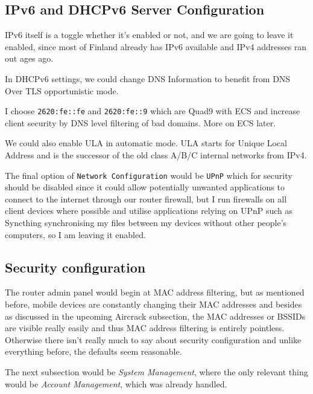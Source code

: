 \documentclass[../wifi-security.tex]{subfiles}
\begin{document}
\subsection{IPv6 and DHCPv6 Server Configuration}

IPv6 itself is a toggle whether it's enabled or not, and we are going to leave it enabled, since most of Finland already has IPv6 available and IPv4 addresses ran out ages ago.

In DHCPv6 settings, we could change DNS Information to benefit from DNS Over TLS opportunistic mode. %


I choose \texttt{2620:fe::fe} and \texttt{2620:fe::9} which are Quad9 with ECS and increase client security by DNS level filtering of bad domains. More on ECS later. %

We could also enable ULA in automatic mode. ULA starts for Unique Local Address and is the successor of the old class A/B/C internal networks from IPv4.

The final option of \texttt{Network Configuration} would be \texttt{UPnP} which for security should be disabled since it could allow potentially unwanted applications to connect to the internet through our router firewall, but I run firewalls on all client devices where possible and utilise applications relying on UPnP such as Syncthing synchronising my files between my devices without other people's computers, so I am leaving it enabled.

\subsection{Security configuration}

The router admin panel would begin at MAC address filtering, but as mentioned before, mobile devices are constantly changing their MAC addresses and besides as discussed in the upcoming Aircrack subsection, the MAC addresses or BSSIDs are visible really easily and thus MAC address filtering is entirely pointless. Otherwise there isn't really much to say about security configuration and unlike everything before, the defaults seem reasonable.

The next subsection would be \textit{System Management}, where the only relevant thing would be \textit{Account Management}, which was already handled.

\printbibliography[title={Chapter references}]
\end{document}

